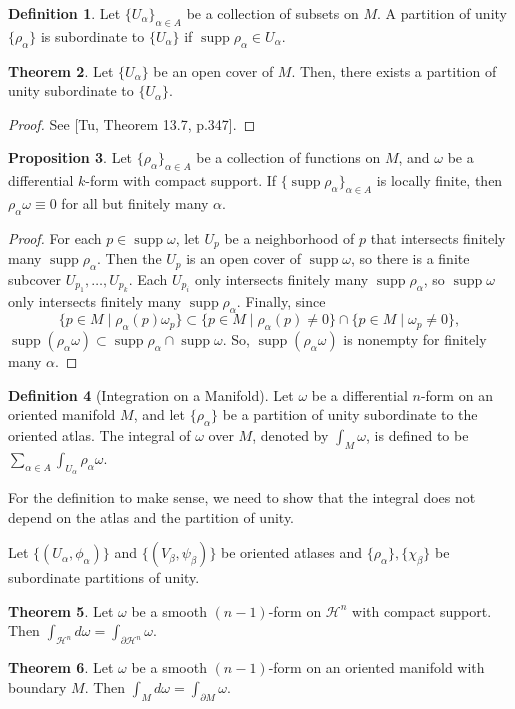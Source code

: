 \documentclass[]{article}
\DeclareMathOperator{\supp}{supp}
\theoremstyle{definition}
\newtheorem{theorem}{Theorem}[section] %
\theoremstyle{definition}
\newtheorem{definition}[theorem]{Definition} %
\newtheorem{proposition}[theorem]{Proposition}
\begin{document}
\begin{definition}
    Let $\{U_\alpha\}_{\alpha\in A}$ be a collection of subsets on $M$. A partition of unity $\{\rho_\alpha\}$ is subordinate to $\{U_\alpha\}$ if $\supp\rho_\alpha\in U_\alpha$.
\end{definition}

\begin{theorem}
    Let $\{U_\alpha\}$ be an open cover of $M$. Then, there exists a partition of unity subordinate to $\{U_\alpha\}$.
\end{theorem}
\begin{proof}
    See [Tu, Theorem 13.7, p.347].
\end{proof}

\begin{proposition}
    Let $\{\rho_\alpha\}_{\alpha\in A}$ be a collection of functions on $M$, and $\omega$ be a differential $k$-form with compact support. If $\{\supp \rho_\alpha\}_{\alpha\in A}$ is locally finite, then $\rho_\alpha\omega\equiv0$ for all but finitely many $\alpha$.
\end{proposition}

\begin{proof}
    For each $p\in \supp\omega$, let $U_p$ be a neighborhood of $p$ that intersects finitely many $\supp\rho_\alpha$. Then the $U_p$ is an open cover of $\supp\omega$, so there is a finite subcover $U_{p_1}, \dots, U_{p_k}$. Each $U_{p_i}$ only intersects finitely many $\supp\rho_\alpha$, so $\supp\omega$ only intersects finitely many $\supp\rho_\alpha$. Finally, since \[\{p\in M\mid \rho_\alpha(p)\omega_p\}\subset\{p\in M\mid \rho_\alpha(p)\neq 0\}\cap \{p\in M\mid \omega_p\neq 0\},\] $\supp(\rho_\alpha\omega)\subset \supp\rho_\alpha\cap \supp\omega$. So, $\supp(\rho_\alpha\omega)$ is nonempty for finitely many $\alpha$.
\end{proof}

\begin{definition}[Integration on a Manifold]
    Let $\omega$ be a differential $n$-form on an oriented manifold $M$, and let $\{\rho_\alpha\}$ be a partition of unity subordinate to the oriented atlas. The integral of $\omega$ over $M$, denoted by $\int_M \omega$, is defined to be $\sum_{\alpha\in A}\int_{U_\alpha}\rho_\alpha\omega$.
\end{definition}

For the definition to make sense, we need to show that the integral does not depend on the atlas and the partition of unity.

Let $\{(U_\alpha, \phi_\alpha)\}$ and $\{(V_\beta, \psi_\beta)\}$ be oriented atlases and $\{\rho_\alpha\}, \{\chi_\beta\}$ be subordinate partitions of unity. 

\begin{theorem}
    Let $\omega$ be a smooth $(n-1)$-form on $\mathcal{H}^n$ with compact support. Then $\int_{\mathcal{H}^n}d\omega=\int_{\partial \mathcal{H}^n}\omega$.
\end{theorem}

\begin{theorem}
    Let $\omega$ be a smooth $(n-1)$-form on an oriented manifold with boundary $M$. Then $\int_{M}d\omega=\int_{\partial M}\omega$.
\end{theorem}
\end{document}
